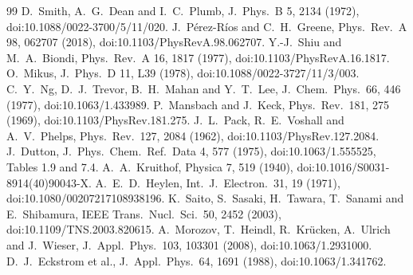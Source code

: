 \documentclass[11pt]{article}
\begin{document}
\begin{thebibliography}{99}
 D.~Smith, A.~G.~Dean and I.~C.~Plumb, J.\ Phys.\ B 5, 2134 (1972), doi:10.1088/0022-3700/5/11/020.
 J.~P\'erez-R\'ios and C.~H.~Greene, Phys.\ Rev.\ A 98, 062707 (2018), doi:10.1103/PhysRevA.98.062707.
 Y.-J.~Shiu and M.~A.~Biondi, Phys.\ Rev.\ A 16, 1817 (1977), doi:10.1103/PhysRevA.16.1817.
 O.~Mikus, J.\ Phys.\ D 11, L39 (1978), doi:10.1088/0022-3727/11/3/003.
 C.~Y.~Ng, D.~J.~Trevor, B.~H.~Mahan and Y.~T.~Lee, J.\ Chem.\ Phys.\ 66, 446 (1977), doi:10.1063/1.433989.
 P.~Mansbach and J.~Keck, Phys.\ Rev.\ 181, 275 (1969), doi:10.1103/PhysRev.181.275.
 J.~L.~Pack, R.~E.~Voshall and A.~V.~Phelps, Phys.\ Rev.\ 127, 2084 (1962), doi:10.1103/PhysRev.127.2084.
 J.~Dutton, J.\ Phys.\ Chem.\ Ref.\ Data 4, 577 (1975), doi:10.1063/1.555525, Tables 1.9 and 7.4.
 A.~A.~Kruithof, Physica 7, 519 (1940), doi:10.1016/S0031-8914(40)90043-X.
 A.~E.~D.~Heylen, Int.\ J.\ Electron.\ 31, 19 (1971), doi:10.1080/00207217108938196.
 K.~Saito, S.~Sasaki, H.~Tawara, T.~Sanami and E.~Shibamura, IEEE Trans.\ Nucl.\ Sci.\ 50, 2452 (2003), doi:10.1109/TNS.2003.820615.
 A.~Morozov, T.~Heindl, R.~Kr\"ucken, A.~Ulrich and J.~Wieser, J.\ Appl.\ Phys.\ 103, 103301 (2008), doi:10.1063/1.2931000.
 D.~J.~Eckstrom et al., J.\ Appl.\ Phys.\ 64, 1691 (1988), doi:10.1063/1.341762.
\end{thebibliography}
\end{document}
